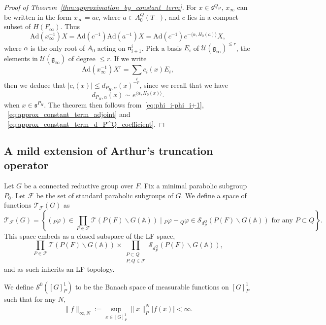 \documentclass[letterpaper,11pt]{amsart}
\newcommand{\fg}{\mathfrak{g}}
\newcommand{\fn}{\mathfrak{n}}
\newcommand{\fs}{\mathfrak{s}}
\newcommand{\bA}{\mathbb{A}}
\newcommand{\cF}{\mathcal{F}}
\newcommand{\cS}{\mathcal{S}}
\newcommand{\cT}{\mathcal{T}}
\newcommand{\cU}{\mathcal{U}}
\newcommand{\bs}{\backslash}
\newcommand{\<}{\negthickspace}
\theoremstyle{definition}
\theoremstyle{plain}
\theoremstyle{remark}
\numberwithin{equation}{section}
\begin{document}
\begin{proof}[Proof of Theorem~\ref{thm:approximation_by_constant_term}]
For $x \in \fs^{Q_H}$, $x_\infty$ can be written in the form $x_\infty=ac$,
where $a \in A_0^Q(T_-)$, and $c$ lies in a compact subset of $H(F_\infty)$. Thus
    \[
    \mathrm{Ad}(x_\infty^{-1})X = \mathrm{Ad}(c^{-1})
    \mathrm{Ad}(a^{-1})X = \mathrm{Ad}(c^{-1})
    e^{-\langle \alpha,H_0(a) \rangle} X,
    \]
    where $\alpha$ is the only root of $A_0$ acting on $\fn_{i+1}^{i}$. Pick a basis $E_i$ of $\cU(\fg_\infty)^{\le r}$, the elements in
$\cU(\fg_\infty)$ of degree $\le r$. If we write
    \begin{equation} \label{eq:approx_constant_term_d_P^Q_coefficient}
     \mathrm{Ad}(x_\infty^{-1})X^r = \sum_i c_i(x)E_i,
    \end{equation}
then we deduce that $|c_i(x)| \le d_{{P_H},\alpha}(x)^{-r}$, since we recall that we have
    \[
    d_{P_H,\alpha}(x) \sim e^{\langle \alpha, H_0(x) \rangle}.
    \]
when $x \in \fs^{P_H}$.
The theorem then follows from~\eqref{eq:phi_i-phi_i+1}, ~\eqref{eq:approx_constant_term_adjoint} and ~\eqref{eq:approx_constant_term_d_P^Q_coefficient}.
\end{proof}







\subsection{A mild extension of Arthur's truncation operator}
\label{subsec:arthur's_truncation}
Let $G$ be a connected reductive group over $F$. Fix a minimal parabolic subgroup $P_0$.
Let $\cF$ be the set of standard parabolic subgroups of $G$. We define a space of functions $\cT_{\cF}(G)$ as
    \[
    \cT_\cF(G) = \left\{ ({}_P \varphi) \in \prod_{P \in \cF}
    \cT(P(F) \bs G(\bA))
    \mid {}_P\varphi - {}_Q\varphi \in \cS_{d_P^Q}(P(F) \bs G(\bA))
    \text{ for any }  P \subset Q   \right\}.
    \]
This space embeds as a closed subspace of the LF space,
    \[
    \prod_{P \in \cF} \cT(P(F) \bs G(\bA)) \times
    \prod_{\substack{P \subset Q \\ P,Q \in \cF}}
    \cS_{d_P^Q}(P(F) \bs G(\bA)),
    \]
and as such inherits an LF topology.


We define $\cS^0([G]_P^1)$ to be the Banach space of measurable functions on $[G]_P^1$ such that for any $N$,
\begin{equation} \label{eq:norm_Schwartz_GP1}
       \|f\|_{\infty,N} := \sup_{x \in [G]_P^1} \|x\|_P^N \lvert f(x) \rvert < \infty.
\end{equation}
\end{document}
